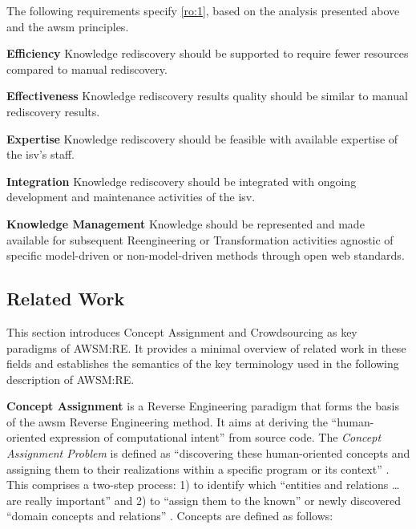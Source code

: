 The following requirements specify \cref{ro:1}, based on the analysis presented above and the \gls{awsm} principles.

\textbf{Efficiency} Knowledge rediscovery should be supported to require fewer resources compared to manual rediscovery.

\vspace{-10pt}
\textbf{Effectiveness} Knowledge rediscovery results quality should be similar to manual rediscovery results.

\vspace{-10pt}
\textbf{Expertise} Knowledge rediscovery should be feasible with available expertise of the \gls{isv}'s staff.

\vspace{-10pt}
\textbf{Integration} Knowledge rediscovery should be integrated with ongoing development and maintenance activities of the \gls{isv}.

\vspace{-10pt}
\textbf{Knowledge Management} Knowledge should be represented and made available for subsequent \gls{Reengineering} or \gls{Transformation} activities agnostic of specific model-driven or non-model-driven methods through open \gls{web} standards.

\vspace{-15pt}
\hypertarget{sec:re.related}{%
\subsection{Related Work}\label{sec:re.related}}
\vspace{10pt}

This section introduces \gls{Concept Assignment} and \gls{Crowdsourcing} as key paradigms of AWSM:RE.
It provides a minimal overview of related work in these fields and establishes the semantics of the key terminology used in the following description of AWSM:RE.

\textbf{\gls{Concept Assignment}} is a \gls{Reverse Engineering} paradigm that forms the basis of the \gls{awsm} \gls{Reverse Engineering} method.
It aims at deriving the ``human-oriented expression of computational intent'' \autocite{Biggerstaff1994ConceptAssignmentJournal} from source code.
The \emph{\gls{Concept Assignment} Problem} is defined as ``discovering these human-oriented concepts and assigning them to their realizations within a specific program or its context'' \autocite{Biggerstaff1994ConceptAssignmentJournal}.
This comprises a two-step process: 1) to identify which ``entities and relations \ldots{} are really important'' and 2) to ``assign them to the known'' or newly discovered ``domain concepts and relations'' \autocite{Biggerstaff1993ConceptAssignmentICSE}.
\glspl{Concept} are defined as follows:

